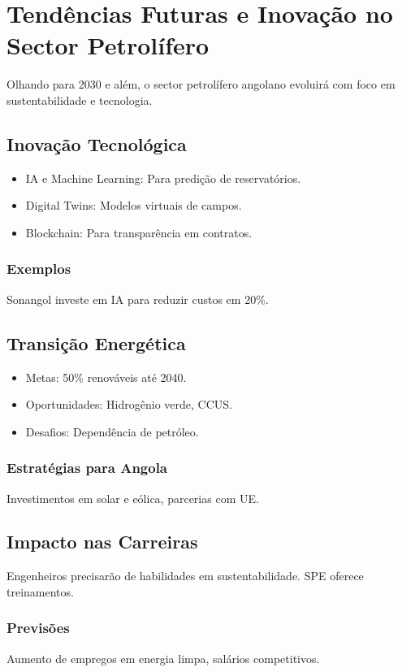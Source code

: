 \documentclass[12pt]{article}
\begin{document}
\newpage

\section{Tendências Futuras e Inovação no Sector Petrolífero}

Olhando para 2030 e além, o sector petrolífero angolano evoluirá com foco em sustentabilidade e tecnologia.

\subsection{Inovação Tecnológica}
\begin{itemize}
    \item IA e Machine Learning: Para predição de reservatórios.
    \item Digital Twins: Modelos virtuais de campos.
    \item Blockchain: Para transparência em contratos.
\end{itemize}

\subsubsection{Exemplos}
Sonangol investe em IA para reduzir custos em 20\%.

\subsection{Transição Energética}
\begin{itemize}
    \item Metas: 50\% renováveis até 2040.
    \item Oportunidades: Hidrogênio verde, CCUS.
    \item Desafios: Dependência de petróleo.
\end{itemize}

\subsubsection{Estratégias para Angola}
Investimentos em solar e eólica, parcerias com UE.

\subsection{Impacto nas Carreiras}
Engenheiros precisarão de habilidades em sustentabilidade. SPE oferece treinamentos.

\subsubsection{Previsões}
Aumento de empregos em energia limpa, salários competitivos.
\end{document}
